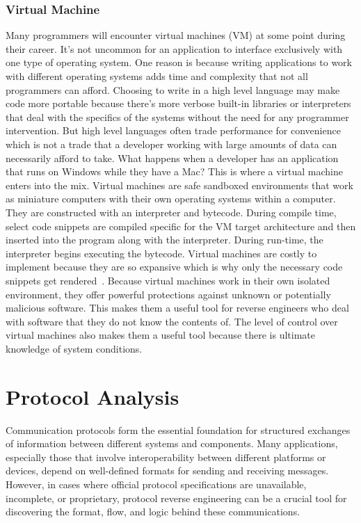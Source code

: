 \subsubsection{Virtual Machine}
Many programmers will encounter virtual machines (VM) at some point during their career. 
It’s not uncommon for an application to interface exclusively with one type of operating system. 
One reason is because writing applications to work with different operating systems adds time and complexity that not all programmers can afford.
Choosing to write in a high level language may make code more portable because there’s more verbose built-in libraries or interpreters that deal with the specifics of the systems without the need for any programmer intervention.
But high level languages often trade performance for convenience which is not a trade that a developer working with large amounts of data can necessarily afford to take.
What happens when a developer has an application that runs on Windows while they have a Mac? 
This is where a virtual machine enters into the mix. Virtual machines are safe sandboxed environments that work as miniature computers with their own operating systems within a computer. 
They are constructed with an interpreter and bytecode. 
During compile time, select code snippets are compiled specific for the VM target architecture and then inserted into the program along with the interpreter. 
During run-time, the interpreter begins executing the bytecode. 
Virtual machines are costly to implement because they are so expansive which is why only the necessary code snippets get rendered~\cite{MasteringRE}.
Because virtual machines work in their own isolated environment, they offer powerful protections against unknown or potentially malicious software. 
This makes them a useful tool for reverse engineers who deal with software that they do not know the contents of. 
The level of control over virtual machines also makes them a useful tool because there is ultimate knowledge of system conditions.


\section{Protocol Analysis}

Communication protocols form the essential foundation for structured exchanges of information between different systems and components. Many applications, especially those that involve interoperability between different platforms or devices, depend on well-defined formats for sending and receiving messages. However, in cases where official protocol specifications are unavailable, incomplete, or proprietary, protocol reverse engineering can be a crucial tool for discovering the format, flow, and logic behind these communications.

